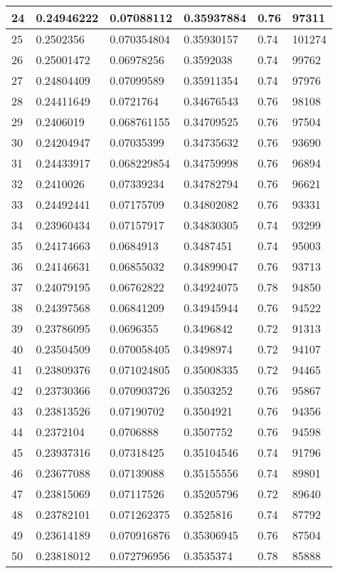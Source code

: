 \begin{longtable}{|l|l|l|l|l|l|}
24 & 0.24946222 & 0.07088112 & 0.35937884 & 0.76 & 97311 \\ \hline 
25 & 0.2502356 & 0.070354804 & 0.35930157 & 0.74 & 101274 \\ \hline 
26 & 0.25001472 & 0.06978256 & 0.3592038 & 0.74 & 99762 \\ \hline 
27 & 0.24804409 & 0.07099589 & 0.35911354 & 0.74 & 97976 \\ \hline 
28 & 0.24411649 & 0.0721764 & 0.34676543 & 0.76 & 98108 \\ \hline 
29 & 0.2406019 & 0.068761155 & 0.34709525 & 0.76 & 97504 \\ \hline 
30 & 0.24204947 & 0.07035399 & 0.34735632 & 0.76 & 93690 \\ \hline 
31 & 0.24433917 & 0.068229854 & 0.34759998 & 0.76 & 96894 \\ \hline 
32 & 0.2410026 & 0.07339234 & 0.34782794 & 0.76 & 96621 \\ \hline 
33 & 0.24492441 & 0.07175709 & 0.34802082 & 0.76 & 93331 \\ \hline 
34 & 0.23960434 & 0.07157917 & 0.34830305 & 0.74 & 93299 \\ \hline 
35 & 0.24174663 & 0.0684913 & 0.3487451 & 0.74 & 95003 \\ \hline 
36 & 0.24146631 & 0.06855032 & 0.34899047 & 0.76 & 93713 \\ \hline 
37 & 0.24079195 & 0.06762822 & 0.34924075 & 0.78 & 94850 \\ \hline 
38 & 0.24397568 & 0.06841209 & 0.34945944 & 0.76 & 94522 \\ \hline 
39 & 0.23786095 & 0.0696355 & 0.3496842 & 0.72 & 91313 \\ \hline 
40 & 0.23504509 & 0.070058405 & 0.3498974 & 0.72 & 94107 \\ \hline 
41 & 0.23809376 & 0.071024805 & 0.35008335 & 0.72 & 94465 \\ \hline 
42 & 0.23730366 & 0.070903726 & 0.3503252 & 0.76 & 95867 \\ \hline 
43 & 0.23813526 & 0.07190702 & 0.3504921 & 0.76 & 94356 \\ \hline 
44 & 0.2372104 & 0.0706888 & 0.3507752 & 0.76 & 94598 \\ \hline 
45 & 0.23937316 & 0.07318425 & 0.35104546 & 0.74 & 91796 \\ \hline 
46 & 0.23677088 & 0.07139088 & 0.35155556 & 0.74 & 89801 \\ \hline 
47 & 0.23815069 & 0.07117526 & 0.35205796 & 0.72 & 89640 \\ \hline 
48 & 0.23782101 & 0.071262375 & 0.3525816 & 0.74 & 87792 \\ \hline 
49 & 0.23614189 & 0.070916876 & 0.35306945 & 0.76 & 87504 \\ \hline 
50 & 0.23818012 & 0.072796956 & 0.3535374 & 0.78 & 85888 \\ \hline 
\end{longtable}